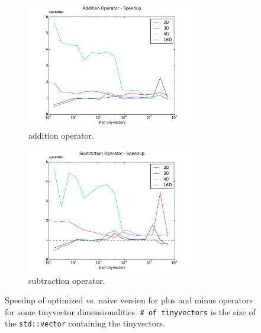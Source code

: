 \documentclass[a4paper]{scrartcl}
\begin{document}
\begin{figure}
    \begin{subfigure}{\textwidth}
        \includegraphics[width=0.8\textwidth]{results/su_plus.pdf}
        \caption{addition operator.}
        \label{fig:su-pl} 
    \end{subfigure}

    \begin{subfigure}{\textwidth}
        \includegraphics[width=0.8\textwidth]{results/su_minus.pdf}
        \caption{subtraction operator.}
        \label{fig:su-mi}
    \end{subfigure}
    \caption{Speedup of optimized vs. naive version for plus and minus operators for some tinyvector dimensionalities. \texttt{\# of tinyvectors} is the size of the \texttt{std::vector} containing the tinyvectors.}
\end{figure}
\end{document}
